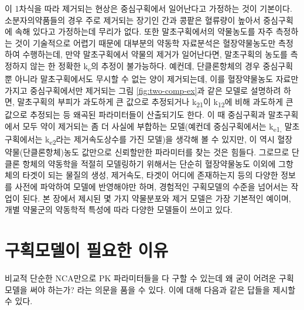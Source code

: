 \documentclass[
  11pt,
  krantz2, a4paper, twoside]{krantz}
\theoremstyle{definition}
\theoremstyle{definition}
\theoremstyle{definition}
\theoremstyle{definition}
\theoremstyle{remark}
\begin{document}
이 1차식을 따라 제거되는 현상은 중심구획에서 일어난다고 가정하는 것이
기본이다. 소분자의약품들의 경우 주로 제거되는 장기인 간과 콩팥은
혈류량이 높아서 중심구획에 속해 있다고 가정하는데 무리가 없다. 또한
말초구획에서의 약물농도를 자주 측정하는 것이 기술적으로 어렵기 때문에
대부분의 약동학 자료분석은 혈장약물농도만 측정하여 수행하는데, 만약
말초구획에서 약물의 제거가 일어난다면, 말초구획의 농도를 측정하지 않는
한 정확한 k\textsubscript{e}의 추정이 불가능하다. 예컨데, 단클론항체의 경우 중심구획
뿐 아니라 말초구획에서도 무시할 수 없는 양이 제거되는데, 이를
혈장약물농도 자료만 가지고 중심구획에서만 제거되는 그림 \ref{fig:two-comp-ex}과 같은
모델로 설명하려 하면, 말초구획의 부피가 과도하게 큰 값으로 추정되거나
k\textsubscript{21}이 k\textsubscript{12}에 비해 과도하게 큰 값으로 추정되는 등 왜곡된 파라미터들이
산출되기도 한다. 이 때 중심구획과 말초구획에서 모두 약이 제거되는 좀 더
사실에 부합하는 모델(예컨데 중심구획에서는 k\textsubscript{e1,} 말초구획에서는
k\textsubscript{e2}라는 제거속도상수를 가진 모델)을 생각해 볼 수 있지만, 이 역시
혈장약물(단클론항체)농도 값만으로 신뢰할만한 파라미터를 찾는 것은
힘들다. 그로므로 단클론 항체의 약동학을 적절히 모델링하기 위해서는
단순히 혈장약물농도 이외에 그항체의 타겟이 되는 물질의 생성, 제거속도,
타겟이 어디에 존재하는지 등의 다양한 정보를 사전에 파악하여 모델에
반영해야만 하며, 경험적인 구획모델의 수준을 넘어서는 작업이 된다. 본
장에서 제시된 몇 가지 약물분포와 제거 모델은 가장 기본적인 예이며, 개별
약물군의 약동학적 특성에 따라 다양한 모델들이 쓰이고 있다.

\hypertarget{uxad6cuxd68duxbaa8uxb378uxc774-uxd544uxc694uxd55c-uxc774uxc720}{%
\section{구획모델이 필요한 이유}\label{uxad6cuxd68duxbaa8uxb378uxc774-uxd544uxc694uxd55c-uxc774uxc720}}

비교적 단순한 NCA만으로 PK 파라미터들을 다 구할 수 있는데 왜 굳이 어려운
구획모델을 써야 하는가? 라는 의문을 품을 수 있다. 이에 대해 다음과 같은
답들을 제시할 수 있다.
\end{document}

